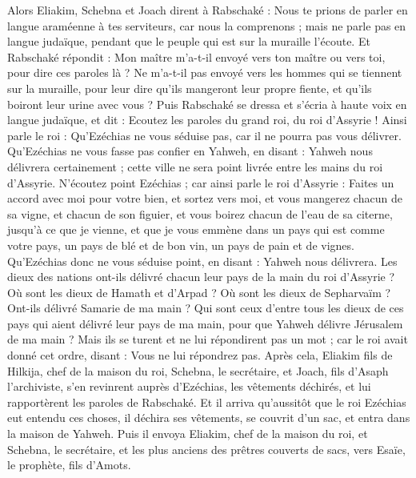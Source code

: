 \begin{multicols}{2}
Alors Eliakim, Schebna et Joach dirent à Rabschaké : Nous te prions de parler en langue araméenne à tes serviteurs, car nous la comprenons ; mais ne parle pas en langue judaïque, pendant que le peuple qui est sur la muraille l'écoute.
Et Rabschaké répondit : Mon maître m'a-t-il envoyé vers ton maître ou vers toi, pour dire ces paroles là ? Ne m'a-t-il pas envoyé vers les hommes qui se tiennent sur la muraille, pour leur dire qu'ils mangeront leur propre fiente, et qu'ils boiront leur urine avec vous ?
Puis Rabschaké se dressa et s'écria à haute voix en langue judaïque, et dit : Ecoutez les paroles du grand roi, du roi d'Assyrie !
Ainsi parle le roi : Qu'Ezéchias ne vous séduise pas, car il ne pourra pas vous délivrer.
Qu'Ezéchias ne vous fasse pas confier en Yahweh, en disant : Yahweh nous délivrera certainement ; cette ville ne sera point livrée entre les mains du roi d'Assyrie.
N'écoutez point Ezéchias ; car ainsi parle le roi d'Assyrie : Faites un accord avec moi pour votre bien, et sortez vers moi, et vous mangerez chacun de sa vigne, et chacun de son figuier, et vous boirez chacun de l'eau de sa citerne,
jusqu'à ce que je vienne, et que je vous emmène dans un pays qui est comme votre pays, un pays de blé et de bon vin, un pays de pain et de vignes.
Qu'Ezéchias donc ne vous séduise point, en disant : Yahweh nous délivrera. Les dieux des nations ont-ils délivré chacun leur pays de la main du roi d'Assyrie ?
Où sont les dieux de Hamath et d'Arpad ? Où sont les dieux de Sepharvaïm ? Ont-ils délivré Samarie de ma main ?
Qui sont ceux d'entre tous les dieux de ces pays qui aient délivré leur pays de ma main, pour que Yahweh délivre Jérusalem de ma main ?
Mais ils se turent et ne lui répondirent pas un mot ; car le roi avait donné cet ordre, disant : Vous ne lui répondrez pas.
Après cela, Eliakim fils de Hilkija, chef de la maison du roi, Schebna, le secrétaire, et Joach, fils d'Asaph l'archiviste, s'en revinrent auprès d'Ezéchias, les vêtements déchirés, et lui rapportèrent les paroles de Rabschaké.
\VerseOne{}Et il arriva qu'aussitôt que le roi Ezéchias eut entendu ces choses, il déchira ses vêtements, se couvrit d'un sac, et entra dans la maison de Yahweh.
Puis il envoya Eliakim, chef de la maison du roi, et Schebna, le secrétaire, et les plus anciens des prêtres couverts de sacs, vers Esaïe, le prophète, fils d'Amots.

\end{multicols}
